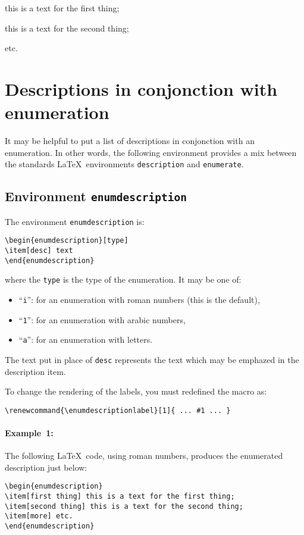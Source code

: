 \documentclass[book]{upmethodology-document}
\begin{document}
\begin{description}[///]
\item[first thing] this is a text for the first thing;
\item[second thing] this is a text for the second thing;
\item[more] etc.
\end{description}

\section{Descriptions in conjonction with enumeration}

It may be helpful to put a list of descriptions in conjonction with an enumeration.
In other words, the following environment provides a mix between the standards \LaTeX~environments \texttt{description} and \texttt{enumerate}.

\subsection{Environment \texttt{enumdescription}}

The environment \texttt{enumdescription} is:
\begin{verbatim}
\begin{enumdescription}[type]
\item[desc] text
\end{enumdescription}
\end{verbatim}
where the \texttt{type} is the type of the enumeration. It may be one of:
\begin{itemize}
\item ``\texttt{i}'': for an enumeration with roman numbers (this is the default),
\item ``\texttt{1}'': for an enumeration with arabic numbers,
\item ``\texttt{a}'': for an enumeration with letters.
\end{itemize}
The text put in place of \texttt{desc} represents the text which may be emphazed in the description item.


To change the rendering of the labels, you must redefined the macro as:
\begin{verbatim}
\renewcommand{\enumdescriptionlabel}[1]{ ... #1 ... }
\end{verbatim}


\paragraph{Example~1:} The following \LaTeX~code, using roman numbers, produces the enumerated description just below:
\begin{verbatim}
\begin{enumdescription}
\item[first thing] this is a text for the first thing;
\item[second thing] this is a text for the second thing;
\item[more] etc.
\end{enumdescription}
\end{verbatim}
\end{document}
